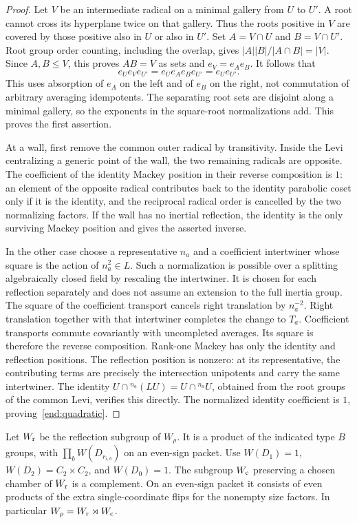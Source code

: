 \begin{proof}
Let $V$ be an intermediate radical on a minimal gallery from $U$
to $U'$.  A root cannot cross its hyperplane twice on that gallery.
Thus the roots positive in $V$ are covered by those positive also
in $U$ or also in $U'$.  Set $A=V\cap U$ and $B=V\cap U'$.  Root
group order counting, including the overlap, gives
$|A||B|/|A\cap B|=|V|$.  Since $A,B\leq V$, this proves $AB=V$
as sets and $e_V=e_Ae_B$.  It follows that
\[
 e_Ue_Ve_{U'}=e_Ue_Ae_Be_{U'}=e_Ue_{U'}.
\]
This uses absorption of $e_A$ on the left and of $e_B$ on the
right, not commutation of arbitrary averaging idempotents.
The separating root sets are disjoint along a minimal gallery,
so the exponents in the square-root normalizations add.  This
proves the first assertion.

At a wall, first remove the common outer radical by transitivity.
Inside the Levi centralizing a generic point of the wall, the two
remaining radicals are opposite.  The coefficient of the identity
Mackey position in their reverse composition is $1$: an element of
the opposite radical contributes back to the identity parabolic
coset only if it is the identity, and the reciprocal radical order
is cancelled by the two normalizing factors.  If the wall has no
inertial reflection, the identity is the only surviving Mackey
position and gives the asserted inverse.

In the other case choose a representative $n_a$ and a coefficient
intertwiner whose square is the action of $n_a^2\in L$.  Such a
normalization is possible over a splitting algebraically closed
field by rescaling the intertwiner.  It is chosen for each reflection
separately and does not assume an extension to the full inertia group.
The square of the coefficient transport cancels right translation
by $n_a^{-2}$.  Right translation together
with that intertwiner completes the change to $T_a$.  Coefficient
transports commute covariantly with uncompleted averages.  Its
square is therefore the reverse composition.  Rank-one Mackey
has only the identity and reflection positions.  The reflection
position is nonzero: at its representative, the contributing
terms are precisely the intersection unipotents and carry the
same intertwiner.  The identity
$U\cap{}^{n_a}(LU)=U\cap{}^{n_a}U$, obtained from the root groups
of the common Levi, verifies this directly.  The normalized
identity coefficient is $1$, proving~\eqref{end:quadratic}.
\end{proof}

Let $W_{\rm r}$ be the reflection subgroup of $W_\rho$.  It is a
product of the indicated type $B$ groups, with
$\prod_b W(D_{r_{i,b}})$ on an even-sign packet.  Use
$W(D_1)=1$, $W(D_2)=C_2\times C_2$, and $W(D_0)=1$.
The subgroup $W_{\rm c}$ preserving a chosen chamber of
$W_{\rm r}$ is a complement.  On an even-sign packet it consists
of even products of the extra single-coordinate flips for the
nonempty size factors.  In particular
$W_\rho=W_{\rm r}\rtimes W_{\rm c}$.

